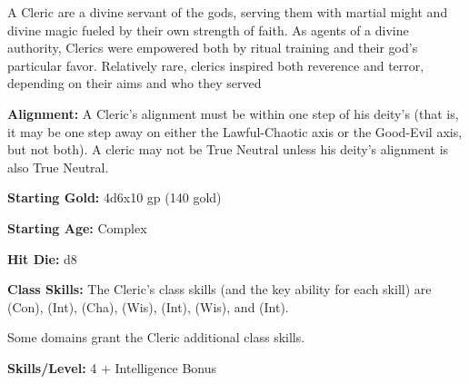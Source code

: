 
A Cleric are a divine servant of the gods, serving them with martial might and divine magic fueled by their own strength of faith. As agents of a divine authority, Clerics were empowered both by ritual training and their god's particular favor. Relatively rare, clerics inspired both reverence and terror, depending on their aims and who they served

\textbf{Alignment:} A Cleric's alignment must be within one step of his deity's (that is, it may be one step away on either the Lawful-Chaotic axis or the Good-Evil axis, but not both). A cleric may not be True Neutral unless his deity's alignment is also True Neutral.

\textbf{Starting Gold:} 4d6x10 gp (140 gold)

\textbf{Starting Age:} Complex

\textbf{Hit Die:} d8

\textbf{Class Skills:} The Cleric's class skills (and the key ability for each skill) are  (Con),  (Int),  (Cha),  (Wis),  (Int),  (Wis), and  (Int).

Some domains grant the Cleric additional class skills.

\textbf{Skills/Level:} 4 + Intelligence Bonus

\modebab{}
\poorfor{}
\poorref{}
\goodwil{}

\begin{fullcastingclasstable}
\end{fullcastingclasstable}

